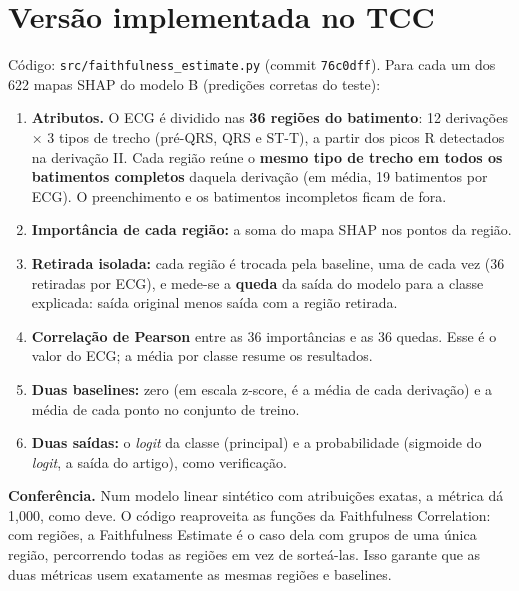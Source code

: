 \documentclass[11pt,a4paper]{article}
\begin{document}
\section{Versão implementada no TCC}
Código: \texttt{src/faithfulness\_estimate.py} (commit \texttt{76c0dff}). Para cada um dos 622 mapas SHAP do modelo B (predições corretas do teste):
\begin{enumerate}
\item \textbf{Atributos.} O ECG é dividido nas \textbf{36 regiões do batimento}: 12 derivações × 3 tipos de trecho (pré-QRS, QRS e ST-T), a partir dos picos R detectados na derivação II. Cada região reúne o \textbf{mesmo tipo de trecho em todos os batimentos completos} daquela derivação (em média, 19 batimentos por ECG). O preenchimento e os batimentos incompletos ficam de fora.
\item \textbf{Importância de cada região:} a soma do mapa SHAP nos pontos da região.
\item \textbf{Retirada isolada:} cada região é trocada pela baseline, uma de cada vez (36 retiradas por ECG), e mede-se a \textbf{queda} da saída do modelo para a classe explicada: saída original menos saída com a região retirada.
\item \textbf{Correlação de Pearson} entre as 36 importâncias e as 36 quedas. Esse é o valor do ECG; a média por classe resume os resultados.
\item \textbf{Duas baselines:} zero (em escala z-score, é a média de cada derivação) e a média de cada ponto no conjunto de treino.
\item \textbf{Duas saídas:} o \textit{logit} da classe (principal) e a probabilidade (sigmoide do \textit{logit}, a saída do artigo), como verificação.
\end{enumerate}
\textbf{Conferência.} Num modelo linear sintético com atribuições exatas, a métrica dá 1,000, como deve. O código reaproveita as funções da Faithfulness Correlation: com regiões, a Faithfulness Estimate é o caso dela com grupos de uma única região, percorrendo todas as regiões em vez de sorteá-las. Isso garante que as duas métricas usem exatamente as mesmas regiões e baselines.
\end{document}
